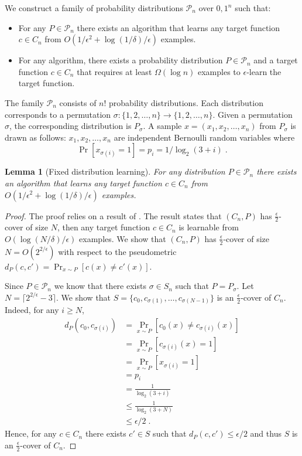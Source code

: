 \documentclass[12pt]{article}
\newtheorem{lemma}[proposition]{Lemma}
\renewcommand{\P}{\mathcal{P}}
\begin{document}
We construct a family of probability distributions $\P_n$ over ${0,1}^n$ such that:
\begin{itemize}
\item For any $P \in \P_n$ there exists an algorithm that learns
any target function $c \in C_n$ from $O(1/\epsilon^2 + \log(1/\delta)/\epsilon)$ examples.
\item For any algorithm, there exists
a probability distribution $P \in \P_n$ and a target function $c \in C_n$
that requires at least $\Omega(\log n)$ examples to $\epsilon$-learn the target function.
\end{itemize}



The family $\P_n$ consists of $n!$ probability distributions. Each distribution
corresponds to a permutation $\sigma:\{1,2,\dots,n\} \to \{1,2,\dots,n\}$. Given
a permutation $\sigma$, the corresponding distribution is $P_\sigma$.
A sample $x = (x_1, x_2, \dots, x_n)$ from $P_\sigma$ is drawn as follows:
$x_1, x_2, \dots, x_n$ are independent Bernoulli random variables
where
$$
\Pr[x_{\sigma(i)} = 1] = p_i = 1/\log_2(3 + i) \; .
$$

\begin{lemma}[Fixed distribution learning]
For any distribution $P \in \P_n$ there exists an algorithm that
learns any target function $c \in C_n$ from $O(1/\epsilon^2 + \log(1/\delta)/\epsilon)$
examples.
\end{lemma}

\begin{proof}
The proof relies on a result of \cite{Benedek-Itai-1991}. The result states that
$(C_n,P)$ has $\tfrac{\epsilon}{2}$-cover of size $N$, then any target function
$c \in C_n$ is learnable from $O(\log(N/\delta)/\epsilon)$ examples. We show
that $(C_n,P)$ has $\tfrac{\epsilon}{2}$-cover of size $N = O(2^{2/\epsilon})$
with respect to the pseudometric $d_P(c,c') = \Pr_{x \sim P}[c(x) \neq c'(x)]$.

Since $P \in \P_n$ we know that there exists $\sigma \in S_n$
such that $P = P_\sigma$. Let $N = \lceil 2^{2/\epsilon} - 3 \rceil$.
We show that $S = \{c_0, c_{\sigma(1)}, \dots, c_{\sigma(N-1)}\}$ is
an $\tfrac{\epsilon}{2}$-cover of $C_n$. Indeed, for any $i \ge N$,
\begin{align*}
d_P(c_0, c_{\sigma(i)})
& = \Pr_{x \sim P}[c_0(x) \neq c_{\sigma(i)}(x)] \\
& = \Pr_{x \sim P}[c_{\sigma(i)}(x) = 1] \\
& = \Pr_{x \sim P}[x_{\sigma(i)} = 1] \\
& = p_i \\
& = \frac{1}{\log_2(3+i)} \\
& \le \frac{1}{\log_2(3+N)} \\
& \le \epsilon/2 \; .
\end{align*}
Hence, for any $c \in C_n$ there exists $c' \in S$ such that $d_P(c,c') \le \epsilon/2$
and thus $S$ is an $\tfrac{\epsilon}{2}$-cover of $C_n$.
\end{proof}
\end{document}
